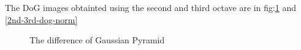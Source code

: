 \documentclass[12pt]{article}
\newenvironment{QandA}
{
	\begin{enumerate}[label=\normalfont\arabic*.,leftmargin=2em,rightmargin=2em]\normalfont
	}
	{
	\end{enumerate}
}
\newenvironment{answered}{\setlength{\parindent}{1em}\par\normalfont}{}
\begin{document}
\begin{QandA}
\begin{answered}
The DoG images obtainted using the second and third octave are in fig:{\ref{2nd-3rd-dog} and \ref{2nd-3rd-dog-norm}}
\begin{figure}
		\centering
  			\caption{The difference of Gaussian Pyramid}
  		\label{2nd-3rd-dog}
\end{figure}
\begin{figure}
		\centering

\end{figure}
\end{answered}
\end{QandA}
\end{document}
